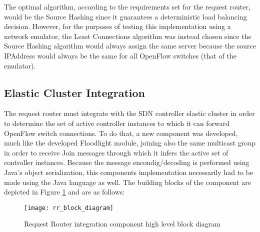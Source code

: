 %
The optimal algorithm, according to the requirements set for the request router, would be the Source Hashing since it guarantees a deterministic load balancing decision.
However, for the purposes of testing this implementation using a network emulator, the Least Connections algorithm was instead chosen since the Source Hashing algorithm would always assign the same server because the source \gls{IPAddress} would always be the same for all OpenFlow switches (that of the emulator).
%
\subsection{Elastic Cluster Integration}
\label{subsection:elastic-cluster-integration-implementation}
The request router must integrate with the \gls{SDN} controller elastic cluster in order to determine the set of active controller instances to which it can forward OpenFlow switch connections.
To do that, a new component was developed, much like the developed Floodlight module, joining also the same multicast group in order to receive Join messages through which it infers the active set of controller instances.
Because the message encondig/decoding is performed using Java's object serialization, this components implementation necessarily had to be made using the Java language as well.
The building blocks of the component are depicted in Figure \ref{fig:rr_block_diagram} and are as follows:
%
\begin{figure}
	\centering
	\texttt{[image: rr\_block\_diagram]}
	\caption{Request Router integration component high level block diagram}
	\label{fig:rr_block_diagram}
\end{figure}
%
